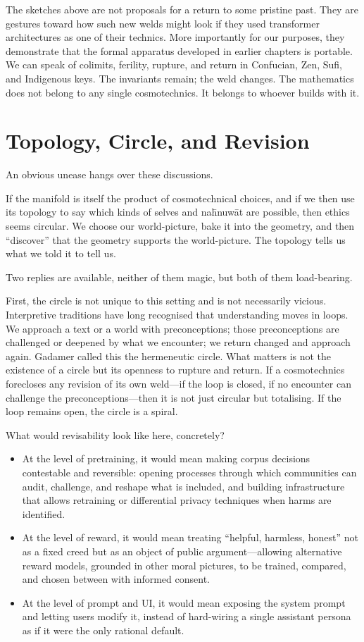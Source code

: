 \documentclass[12pt,a4paper]{article}
\begin{document}
The sketches above are not proposals for a return to some pristine past. They are gestures toward how such new welds might look if they used transformer architectures as one of their technics. More importantly for our purposes, they demonstrate that the formal apparatus developed in earlier chapters is portable. We can speak of colimits, ferility, rupture, and return in Confucian, Zen, Sufi, and Indigenous keys. The invariants remain; the weld changes. The mathematics does not belong to any single cosmotechnics. It belongs to whoever builds with it.

\section{Topology, Circle, and Revision}

An obvious unease hangs over these discussions.

If the manifold is itself the product of cosmotechnical choices, and if we then use its topology to say which kinds of selves and na\={h}nuw\={a}t are possible, then ethics seems circular. We choose our world-picture, bake it into the geometry, and then ``discover'' that the geometry supports the world-picture. The topology tells us what we told it to tell us.

Two replies are available, neither of them magic, but both of them load-bearing.

First, the circle is not unique to this setting and is not necessarily vicious. Interpretive traditions have long recognised that understanding moves in loops. We approach a text or a world with preconceptions; those preconceptions are challenged or deepened by what we encounter; we return changed and approach again. Gadamer called this the hermeneutic circle. What matters is not the existence of a circle but its openness to rupture and return. If a cosmotechnics forecloses any revision of its own weld---if the loop is closed, if no encounter can challenge the preconceptions---then it is not just circular but totalising. If the loop remains open, the circle is a spiral.

What would revisability look like here, concretely?

\begin{itemize}
  \item At the level of pretraining, it would mean making corpus decisions contestable and reversible: opening processes through which communities can audit, challenge, and reshape what is included, and building infrastructure that allows retraining or differential privacy techniques when harms are identified.
  \item At the level of reward, it would mean treating ``helpful, harmless, honest'' not as a fixed creed but as an object of public argument---allowing alternative reward models, grounded in other moral pictures, to be trained, compared, and chosen between with informed consent.
  \item At the level of prompt and UI, it would mean exposing the system prompt and letting users modify it, instead of hard-wiring a single assistant persona as if it were the only rational default.
\end{itemize}
\end{document}
